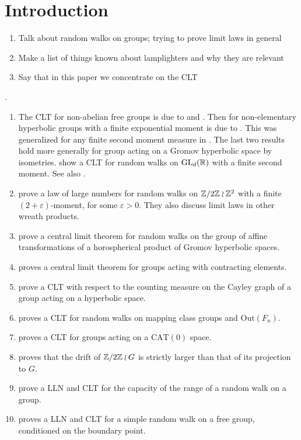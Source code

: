 \section{Introduction}



\begin{enumerate}
\item	Talk about random walks on groups; trying to prove limit laws in general
\item Make a list of things known about lamplighters and why they are relevant
\item Say that in this paper we concentrate on the CLT
\end{enumerate}
\cite{Salaun2001}.

\begin{enumerate}
	\item The CLT for non-abelian free groups is due to \cite{SawyerSteger1987} and \cite{Ledrappier2001}. Then for non-elementary hyperbolic groups with a finite exponential moment is due to \cite{Bjorklund2010}. This was generalized for any finite second moment measure in \cite{BenoistQuint2016hyperbolic}. The last two results hold more generally for group acting on a Gromov hyperbolic space by isometries. \cite{BenoistQuint2016} show a CLT for random walks on $\mathrm{GL}_d(\mathbb{R})$ with a finite second moment. See also \cite{Gouezel2017}.
	\item \cite{ErschlerZheng2022} prove a law of large numbers for random walks on $\mathbb{Z}/2\mathbb{Z}\wr \mathbb{Z}^2$ with a finite $(2+\varepsilon)$-moment, for some $\varepsilon>0$. They also discuss limit laws in other wreath products.
	\item \cite{BahmanianForghaniGekhtmanMallahiKarai2024} prove a central limit theorem for random walks on the group of affine transformations of a horospherical product of Gromov hyperbolic spaces.
	\item \cite{Choi2023} proves a central limit theorem for groups acting with contracting elements.
	\item \cite{GekhtmanTaylorTiozzo2022} prove a CLT with respect to the counting measure on the Cayley graph of a group acting on a hyperbolic space.
	\item \cite{Horbez2018} proves a CLT for random walks on mapping class groups and $\mathrm{Out}(F_n).$
	\item \cite{LeBars2022} proves a CLT for groups acting on a $\mathrm{CAT}(0)$ space.
	\item  \cite{Gilch2008} proves that the drift of $\mathbb{Z}/2\mathbb{Z}\wr G$ is strictly larger than that of its projection to $G$.
	\item \cite{MrazovicSandriSebek2023} prove a LLN and CLT for the capacity of the range of a random walk on a group.
	\item \cite{Salaun2001} proves a LLN and CLT for a simple random walk on a free group, conditioned on the boundary point.
\end{enumerate}


